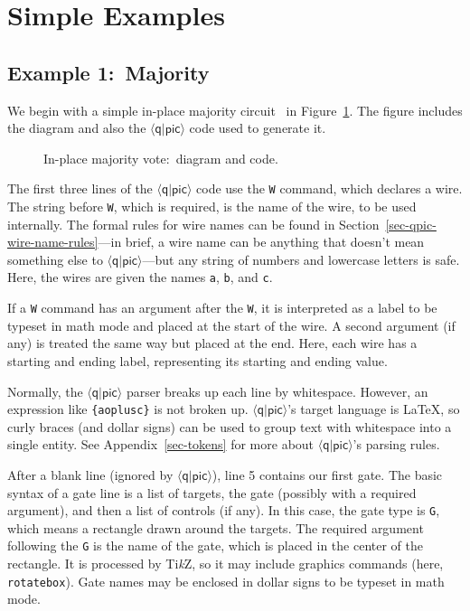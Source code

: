 \documentclass[twoside,12pt]{article}
\newcommand{\qpic}{$\langle\mathsf{q}|\mathsf{pic}\rangle$\xspace}
\newcommand{\TikZ}{Ti\emph{k}Z\xspace}
\begin{document}
\section{Simple Examples}
\label{sec-example}
\subsection{Example 1:\ Majority}
\label{sec-example-maj}
We begin with a simple in-place majority circuit~\cite{CDKM} in Figure~\ref{fig-maj}.  The figure includes the diagram and also the \qpic code used to generate it.
\begin{figure}[h!]
\begin{center}


\begin{minipage}{2in}

\end{minipage}
\end{center}
\caption{In-place majority vote:\ diagram and code.}
\label{fig-maj}
\end{figure}

The first three lines of the \qpic code use the {\tt W} command, which declares a wire.  The string before {\tt W}, which is required, is the name of the wire, to be used internally.  The formal rules for wire names can be found in
Section~\ref{sec-qpic-wire-name-rules}---in brief, a wire name can be anything that doesn't mean something else to \qpic---but any string of numbers and lowercase
letters is safe.  Here, the wires are given the names {\tt a}, {\tt b}, and
{\tt c}.


If a {\tt W} command has an argument after the {\tt W}, it is interpreted as a label to be
typeset in math mode and placed at the start of the wire.  A second argument (if any) is treated the same way but placed at the end.  Here, each wire has a starting and ending label, representing its starting and ending value.


Normally, the \qpic parser breaks up each line by whitespace.  However,
an expression like {\tt \{a{\textvisiblespace}{}oplus{\textvisiblespace}c\}} is not
broken up.  \qpic's target language is {\LaTeX}, so curly
braces (and dollar signs) can be used to group text with whitespace into
a single entity.  See Appendix~\ref{sec-tokens} for more about \qpic's parsing
rules.


After a blank line (ignored by \qpic), line 5 contains our first gate.
The basic syntax of a gate line is a list of targets, the gate (possibly
with a required argument), and then a list of controls (if any).  In this case,
the gate type is {\tt G}, which means a rectangle drawn around the targets.
The required argument following the {\tt G} is the name of the gate, which
is placed in the center of the rectangle.  It is processed by \TikZ, so it
may include graphics commands (here, {\tt {}rotatebox}).  Gate names
may be enclosed in dollar signs to be typeset in math mode.
\end{document}
